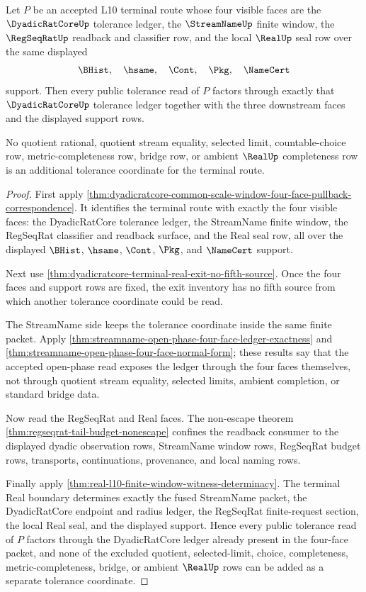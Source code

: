 \begin{theorem}
\label{thm:dyadicratcore-terminal-four-face-tolerance-exhaustion}
Let $P$ be an accepted L10 terminal route whose four visible faces are the $\DyadicRatCoreUp$ tolerance ledger, the $\StreamNameUp$ finite window, the $\RegSeqRatUp$ readback and classifier row, and the local $\RealUp$ seal row over the same displayed
$$
\BHist,\quad \hsame,\quad \Cont,\quad \Pkg,\quad \NameCert
$$
support. Then every public tolerance read of $P$ factors through exactly that $\DyadicRatCoreUp$ tolerance ledger together with the three downstream faces and the displayed support rows.

No quotient rational, quotient stream equality, selected limit, countable-choice row, metric-completeness row, bridge row, or ambient $\RealUp$ completeness row is an additional tolerance coordinate for the terminal route.
\end{theorem}
\begin{proof}
First apply \autoref{thm:dyadicratcore-common-scale-window-four-face-pullback-correspondence}. It identifies the terminal route with exactly the four visible faces: the DyadicRatCore tolerance ledger, the StreamName finite window, the RegSeqRat classifier and readback surface, and the Real seal row, all over the displayed $\BHist$, $\hsame$, $\Cont$, $\Pkg$, and $\NameCert$ support.

Next use \autoref{thm:dyadicratcore-terminal-real-exit-no-fifth-source}. Once the four faces and support rows are fixed, the exit inventory has no fifth source from which another tolerance coordinate could be read.

The StreamName side keeps the tolerance coordinate inside the same finite packet. Apply \autoref{thm:streamname-open-phase-four-face-ledger-exactness} and \autoref{thm:streamname-open-phase-four-face-normal-form}; these results say that the accepted open-phase read exposes the ledger through the four faces themselves, not through quotient stream equality, selected limits, ambient completion, or standard bridge data.

Now read the RegSeqRat and Real faces. The non-escape theorem \autoref{thm:regseqrat-tail-budget-nonescape} confines the readback consumer to the displayed dyadic observation rows, StreamName window rows, RegSeqRat budget rows, transports, continuations, provenance, and local naming rows.

Finally apply \autoref{thm:real-l10-finite-window-witness-determinacy}. The terminal Real boundary determines exactly the fused StreamName packet, the DyadicRatCore endpoint and radius ledger, the RegSeqRat finite-request section, the local Real seal, and the displayed support. Hence every public tolerance read of $P$ factors through the DyadicRatCore ledger already present in the four-face packet, and none of the excluded quotient, selected-limit, choice, completeness, metric-completeness, bridge, or ambient $\RealUp$ rows can be added as a separate tolerance coordinate.
\end{proof}


